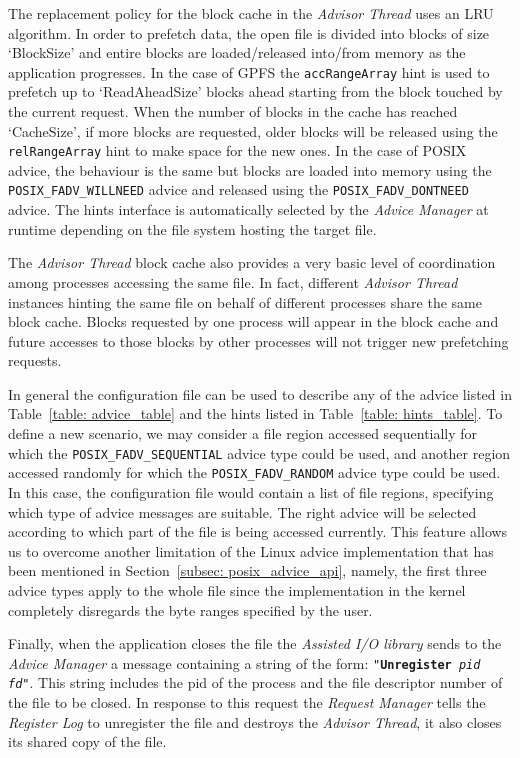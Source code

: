 The replacement policy for the block cache in the \textit{Advisor Thread} uses an LRU algorithm. In order to prefetch data, the open file is divided into blocks of size `BlockSize' and entire blocks are loaded/released into/from memory as the application progresses. In the case of GPFS the \texttt{accRangeArray} hint is used to prefetch up to `ReadAheadSize' blocks ahead starting from the block touched by the current request. When the number of blocks in the cache has reached `CacheSize', if more blocks are requested, older blocks will be released using the \texttt{relRangeArray} hint to make space for the new ones. In the case of POSIX advice, the behaviour is the same but blocks are loaded into memory using the \texttt{POSIX\_FADV\_WILLNEED} advice and released using the \texttt{POSIX\_FADV\_DONTNEED} advice. The hints interface is automatically selected by the \textit{Advice Manager} at runtime depending on the file system hosting the target file. 

The \textit{Advisor Thread} block cache also provides a very basic level of coordination among processes accessing the same file. In fact, different \textit{Advisor Thread} instances hinting the same file on behalf of different processes share the same block cache. Blocks requested by one process will appear in the block cache and future accesses to those blocks by other processes will not trigger new prefetching requests.

In general the configuration file can be used to describe any of the advice listed in Table~\ref{table: advice_table} and the hints listed in Table~\ref{table: hints_table}. To define a new scenario, we may consider a file region accessed sequentially for which the \texttt{POSIX\_FADV\_SEQUENTIAL} advice type could be used, and another region accessed randomly for which the \texttt{POSIX\_FADV\_RANDOM} advice type could be used. In this case, the configuration file would contain a list of file regions, specifying which type of advice messages are suitable. The right advice will be selected according to which part of the file is being accessed currently. This feature allows us to overcome another limitation of the Linux advice implementation that has been mentioned in Section~\ref{subsec: posix_advice_api}, namely, the first three advice types apply to the whole file since the implementation in the kernel completely disregards the byte ranges specified by the user.
 
Finally, when the application closes the file the \textit{Assisted I/O library} sends to the \textit{Advice Manager} a message containing a string of the form: \texttt{"\textbf{Unregister} \textit{pid} \textit{fd}"}. This string includes the pid of the process and the file descriptor number of the file to be closed. In response to this request the \textit{Request Manager} tells the \textit{Register Log} to unregister the file and destroys the \textit{Advisor Thread}, it also closes its shared copy of the file.

